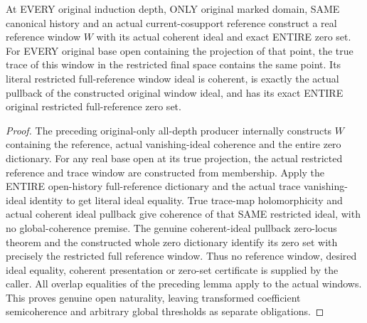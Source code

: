 \begin{theorem}
\label{hir:original-full-reference-original-only-coherent-open-windows}
\leanok
{}
At EVERY original induction depth, ONLY original marked domain, SAME
canonical history and an actual current-cosupport reference construct a real
reference window $W$ with its actual coherent ideal and exact ENTIRE zero
set. For EVERY original base open containing the projection of that point,
the true trace of this window in the restricted final space contains the
same point. Its literal restricted full-reference window ideal is coherent,
is exactly the actual pullback of the constructed original window ideal,
and has its exact ENTIRE original restricted full-reference zero set.
\end{theorem}
\begin{proof}
The preceding original-only all-depth producer internally constructs $W$
containing the reference, actual vanishing-ideal coherence and the entire
zero dictionary. For any real base open at its true projection, the actual
restricted reference and trace window are constructed from membership.
Apply the ENTIRE open-history full-reference dictionary and the actual trace
vanishing-ideal identity to get literal ideal equality. True trace-map
holomorphicity and actual coherent ideal pullback give coherence of that
SAME restricted ideal, with no global-coherence premise. The genuine
coherent-ideal pullback zero-locus theorem and the constructed whole zero
dictionary identify its zero set with precisely the restricted full
reference window. Thus no reference window, desired ideal equality,
coherent presentation or zero-set certificate is supplied by the caller.
All overlap equalities of the preceding lemma apply to the actual windows.
This proves genuine open naturality, leaving transformed coefficient
semicoherence and arbitrary global thresholds as separate obligations.
\end{proof}
